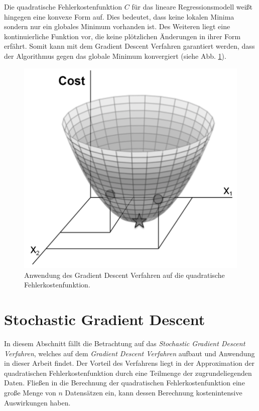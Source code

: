 \noindent
Die quadratische Fehlerkostenfunktion $C$ für das lineare Regressionsmodell weißt hingegen eine konvexe Form auf. Dies bedeutet, dass keine lokalen Minima sondern nur ein globales Minimum vorhanden ist. Des Weiteren liegt eine kontinuierliche Funktion vor, die keine plötzlichen Änderungen in ihrer Form erfährt. Somit kann mit dem Gradient Descent Verfahren garantiert werden, dass der Algorithmus gegen das globale Minimum konvergiert (siehe Abb. \ref{fig:gradient_descent5}).
\begin{figure}[hbt]
	\centering
	\includegraphics[scale=0.25]{Bilder/gradient_descent5}
	\caption{Anwendung des Gradient Descent Verfahren auf die quadratische Fehlerkostenfunktion. \cite{buduma:2017}} 
	\label{fig:gradient_descent5} 
\end{figure}

\section{Stochastic Gradient Descent}
In diesem Abschnitt fällt die Betrachtung auf das \textit{Stochastic Gradient Descent Verfahren}, welches auf dem \textit{Gradient Descent Verfahren} aufbaut und Anwendung in dieser Arbeit findet. Der Vorteil des Verfahrens liegt in der Approximation der quadratischen Fehlerkostenfunktion durch eine Teilmenge der zugrundeliegenden Daten. Fließen in die Berechnung der quadratischen Fehlerkostenfunktion eine große Menge von $n$ Datensätzen ein, kann dessen Berechnung kostenintensive Auswirkungen haben. \\

